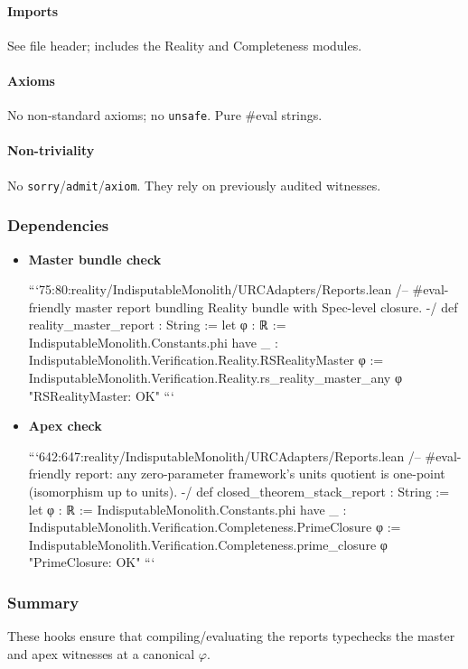 \documentclass{article}
\begin{document}
\paragraph{Imports}
See file header; includes the Reality and Completeness modules.

\paragraph{Axioms}
No non‑standard axioms; no \texttt{unsafe}. Pure #eval strings.

\paragraph{Non-triviality}
No \texttt{sorry}/\texttt{admit}/\texttt{axiom}. They rely on previously audited witnesses.

\subsubsection{Dependencies}
\begin{itemize}[leftmargin=*]
  \item \textbf{Master bundle check}

```75:80:reality/IndisputableMonolith/URCAdapters/Reports.lean
/-- #eval-friendly master report bundling Reality bundle with Spec-level closure. -/
 def reality_master_report : String :=
  let φ : ℝ := IndisputableMonolith.Constants.phi
  have _ : IndisputableMonolith.Verification.Reality.RSRealityMaster φ :=
    IndisputableMonolith.Verification.Reality.rs_reality_master_any φ
  "RSRealityMaster: OK"
```

  \item \textbf{Apex check}

```642:647:reality/IndisputableMonolith/URCAdapters/Reports.lean
/-- #eval-friendly report: any zero-parameter framework's units quotient is one-point (isomorphism up to units). -/
 def closed_theorem_stack_report : String :=
  let φ : ℝ := IndisputableMonolith.Constants.phi
  have _ : IndisputableMonolith.Verification.Completeness.PrimeClosure φ :=
    IndisputableMonolith.Verification.Completeness.prime_closure φ
  "PrimeClosure: OK"
```
\end{itemize}

\subsubsection{Summary}
These hooks ensure that compiling/evaluating the reports typechecks the master and apex witnesses at a canonical \(\varphi\).
\end{document}
